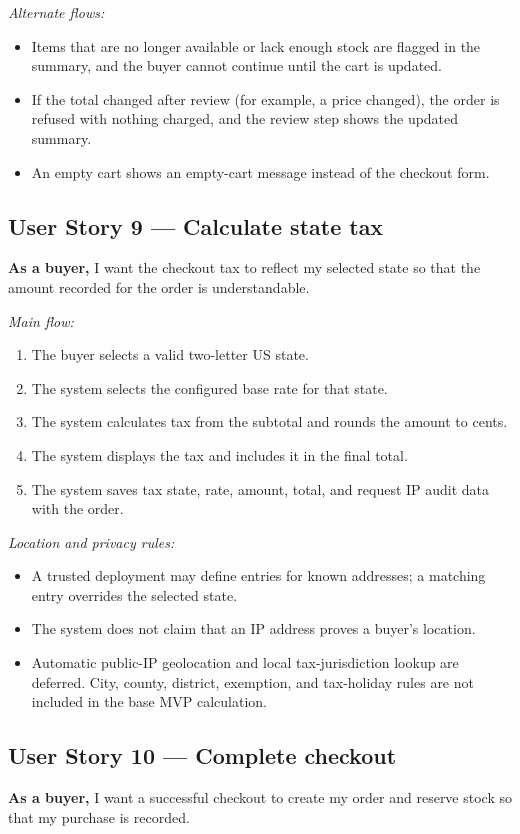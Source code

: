 \documentclass[11pt]{scrreprt}
\newcommand{\code}[1]{\texttt{\detokenize{#1}}}
\begin{document}
\textit{Alternate flows:}
\begin{itemize}
\item Items that are no longer available or lack enough stock are flagged in
the summary, and the buyer cannot continue until the cart is updated.
\item If the total changed after review (for example, a price changed), the
order is refused with nothing charged, and the review step shows the updated
summary.
\item An empty cart shows an empty-cart message instead of the checkout form.
\end{itemize}

\subsection{User Story 9 --- Calculate state tax}
\textbf{As a buyer,} I want the checkout tax to reflect my selected state so
that the amount recorded for the order is understandable.

\textit{Main flow:}
\begin{enumerate}
\item The buyer selects a valid two-letter US state.
\item The system selects the configured base rate for that state.
\item The system calculates tax from the subtotal and rounds the amount to cents.
\item The system displays the tax and includes it in the final total.
\item The system saves tax state, rate, amount, total, and request IP audit data
with the order.
\end{enumerate}

\textit{Location and privacy rules:}
\begin{itemize}
\item A trusted deployment may define \code{IP_STATE_MAP} entries for known
addresses; a matching entry overrides the selected state.
\item The system does not claim that an IP address proves a buyer's location.
\item Automatic public-IP geolocation and local tax-jurisdiction lookup are
deferred. City, county, district, exemption, and tax-holiday rules are not
included in the base MVP calculation.
\end{itemize}

\subsection{User Story 10 --- Complete checkout}
\textbf{As a buyer,} I want a successful checkout to create my order and
reserve stock so that my purchase is recorded.
\end{document}
